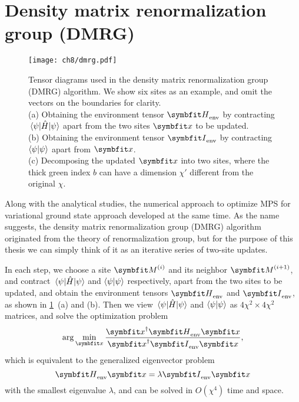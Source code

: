 \section{Density matrix renormalization group (DMRG)}
\label{sec:dmrg}

\begin{figure}[htb]
\centering
\texttt{[image: ch8/dmrg.pdf]}
\caption[Density matrix renormalization group (DMRG)]{
Tensor diagrams used in the density matrix renormalization group (DMRG) algorithm. We show six sites as an example, and omit the vectors on the boundaries for clarity. \\
(a) Obtaining the environment tensor $\mH_\text{env}$ by contracting $\mel{\psi}{\hat{H}}{\psi}$ apart from the two sites $\vx$ to be updated. \\
(b) Obtaining the environment tensor $\mI_\text{env}$ by contracting $\ip{\psi}$ apart from $\vx$. \\
(c) Decomposing the updated $\vx$ into two sites, where the thick green index $b$ can have a dimension $\chi'$ different from the original $\chi$.
}
\label{fig:dmrg}
\end{figure}

Along with the analytical studies, the numerical approach to optimize MPS for variational ground state approach developed at the same time. As the name suggests, the density matrix renormalization group (DMRG) algorithm~\cite{white1992density, schollwock2005density} originated from the theory of renormalization group, but for the purpose of this thesis we can simply think of it as an iterative series of two-site updates.

In each step, we choose a site $\mM^{(i)}$ and its neighbor $\mM^{(i + 1)}$, and contract $\mel{\psi}{\hat{H}}{\psi}$ and $\ip{\psi}$ respectively, apart from the two sites to be updated, and obtain the environment tensors $\mH_\text{env}$ and $\mI_\text{env}$, as shown in \cref{fig:dmrg}~(a) and (b). Then we view $\mel{\psi}{\hat{H}}{\psi}$ and $\ip{\psi}$ as $4 \chi^2 \times 4 \chi^2$ matrices, and solve the optimization problem
\begin{equation}
\arg\min_\vx \frac{\vx^\dagger \mH_\text{env} \vx}{\vx^\dagger \mI_\text{env} \vx},
\end{equation}
which is equivalent to the generalized eigenvector problem
\begin{equation}
\mH_\text{env} \vx = \lambda \mI_\text{env} \vx
\end{equation}
with the smallest eigenvalue $\lambda$, and can be solved in $O(\chi^4)$ time and space.

